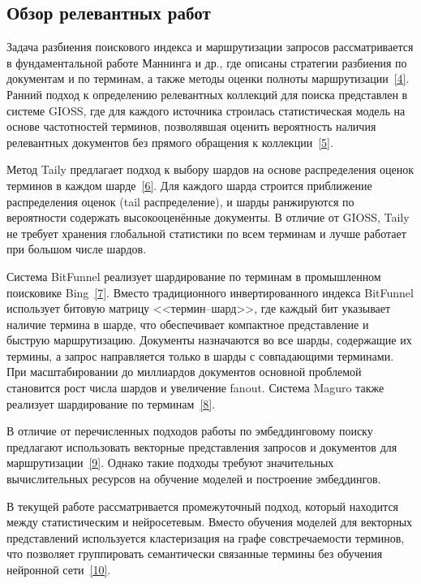 \documentclass[14pt, a4paper]{article}
\newcommand{\srcref}[1]{\hyperlink{src:i#1}{[#1]}}
\begin{document}
	\subsection{Обзор релевантных работ}

	Задача разбиения поискового индекса и маршрутизации запросов рассматривается в фундаментальной работе Маннинга и др., где описаны стратегии разбиения по документам и по терминам, а также методы оценки полноты маршрутизации~\srcref{4}.
	Ранний подход к определению релевантных коллекций для поиска представлен в системе GIOSS, где для каждого источника строилась статистическая модель на основе частотностей терминов, позволявшая оценить вероятность наличия релевантных документов без прямого обращения к коллекции~\srcref{5}.

	Метод Taily предлагает подход к выбору шардов на основе распределения оценок терминов в каждом шарде~\srcref{6}.
	Для каждого шарда строится приближение распределения оценок (tail распределение), и шарды ранжируются по вероятности содержать высокооценённые документы.
	В отличие от GIOSS, Taily не требует хранения глобальной статистики по всем терминам и лучше работает при большом числе шардов.

	Система BitFunnel реализует шардирование по терминам в промышленном поисковике Bing~\srcref{7}.
	Вместо традиционного инвертированного индекса BitFunnel использует битовую матрицу <<термин--шард>>, где каждый бит указывает наличие термина в шарде, что обеспечивает компактное представление и быструю маршрутизацию.
	Документы назначаются во все шарды, содержащие их термины, а запрос направляется только в шарды с совпадающими терминами.
	При масштабировании до миллиардов документов основной проблемой становится рост числа шардов и увеличение fanout.
	Система Maguro также реализует шардирование по терминам~\srcref{8}.

	В отличие от перечисленных подходов работы по эмбеддинговому поиску предлагают использовать векторные представления запросов и документов для маршрутизации~\srcref{9}.
	Однако такие подходы требуют значительных вычислительных ресурсов на обучение моделей и построение эмбеддингов.

	В текущей работе рассматривается промежуточный подход, который находится между статистическим и нейросетевым.
	Вместо обучения моделей для векторных представлений используется кластеризация на графе совстречаемости терминов, что позволяет группировать семантически связанные термины без обучения нейронной сети~\srcref{10}.

	\clearpage
\end{document}
